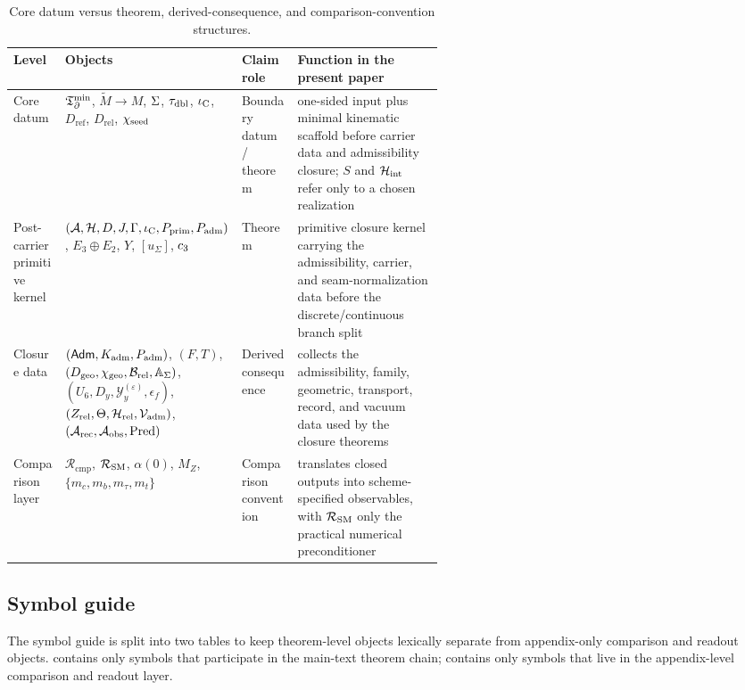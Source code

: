 \begin{table}[t]
\centering
\small
\begin{tabularx}{\linewidth}{@{}>{\raggedright\arraybackslash}p{0.12\linewidth}>{\raggedright\arraybackslash}p{0.31\linewidth}>{\raggedright\arraybackslash}p{0.13\linewidth}Y@{}}
\toprule
Level & Objects & Claim role & Function in the present paper \\
\midrule
Core datum & $\mathfrak T_{\partial}^{\min}$, $\widetilde M\to M$, $\Sigma$, $\tau_{\mathrm{dbl}}$, $\iota_{\mathrm C}$, $D_{\mathrm{ref}}$, $D_{\mathrm{rel}}$, $\chi_{\mathrm{seed}}$ & Boundary datum / theorem & one-sided input plus minimal kinematic scaffold before carrier data and admissibility closure; $S$ and $\mathcal H_{\mathrm{int}}$ refer only to a chosen realization \\
Post-carrier primitive kernel & $(\mathcal A,\mathcal H,D,J,\Gamma,\iota_{\mathrm C},P_{\mathrm{prim}},P_{\mathrm{adm}})$, $E_3\oplus E_2$, $Y$, $[u_\Sigma]$, $c_3$ & Theorem & primitive closure kernel carrying the admissibility, carrier, and seam-normalization data before the discrete/continuous branch split \\
Closure data & $(\mathsf{Adm},K_{\mathrm{adm}},P_{\mathrm{adm}})$, $(F,T)$, $(D_{\mathrm{geo}},\chi_{\mathrm{geo}},\mathcal B_{\mathrm{rel}},\mathbb A_{\Sigma})$, $(U_6,D_y,\mathcal Y_y^{(\varepsilon)},\epsilon_f)$, $(Z_{\mathrm{rel}},\Theta,\mathcal H_{\mathrm{rel}},\mathcal V_{\mathrm{adm}})$, $(\mathcal A_{\mathrm{rec}},\mathcal A_{\mathrm{obs}},\operatorname{Pred})$ & Derived consequence & collects the admissibility, family, geometric, transport, record, and vacuum data used by the closure theorems \\
Comparison layer & $\mathcal R_{\mathrm{cmp}}$, $\mathcal R_{\mathrm{SM}}$, $\alpha(0)$, $M_Z$, $\{m_c,m_b,m_\tau,m_t\}$ & Comparison convention & translates closed outputs into scheme-specified observables, with $\mathcal R_{\mathrm{SM}}$ only the practical numerical preconditioner \\
\bottomrule
\end{tabularx}
\caption{Core datum versus theorem, derived-consequence, and comparison-convention structures.}
\label{tab:layered-datum}
\end{table}

\subsection{Symbol guide}

The symbol guide is split into two tables to keep theorem-level objects lexically separate from
appendix-only comparison and readout objects.  contains only
symbols that participate in the main-text theorem chain; 
contains only symbols that live in the appendix-level comparison and readout layer.

